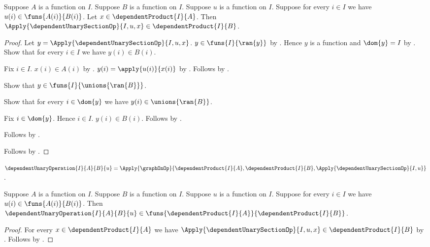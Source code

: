 \begin{proposition}\label{dependent_unary_section_type}
    Suppose $A$ is a function on $I$.
    Suppose $B$ is a function on $I$.
    Suppose $u$ is a function on $I$.
    Suppose for every $i\in I$ we have $u(i)\in\funs{A(i)}{B(i)}$.
    Let $x\in\dependentProduct{I}{A}$.
    Then
        $\Apply{\dependentUnarySectionOp}{I,u,x}
            \in\dependentProduct{I}{B}$.
\end{proposition}
\begin{proof}
    Let $y=\Apply{\dependentUnarySectionOp}{I,u,x}$.
    $y\in\funs{I}{\ran{y}}$ by
        .
    Hence $y$ is a function and $\dom{y}=I$ by
        .
    Show that for every $i\in I$ we have $y(i)\in B(i)$.
    \begin{subproof}
        Fix $i\in I$.
        $x(i)\in A(i)$ by .
        $y(i)=\apply{u(i)}{x(i)}$ by
            .
        Follows by .
    \end{subproof}
    Show that $y\in\funs{I}{\unions{\ran{B}}}$.
    \begin{subproof}
        Show that for every $i\in\dom{y}$ we have
            $y(i)\in\unions{\ran{B}}$.
        \begin{subproof}
            Fix $i\in\dom{y}$.
            Hence $i\in I$.
            $y(i)\in B(i)$.
            Follows by .
        \end{subproof}
        Follows by .
    \end{subproof}
    Follows by .
\end{proof}

\begin{definition}\label{dependent_unary_operation}
    $\dependentUnaryOperation{I}{A}{B}{u}
        =\Apply{\graphOnOp}{
            \dependentProduct{I}{A},\dependentProduct{I}{B},
            \Apply{\dependentUnarySectionOp}{I,u}}$.
\end{definition}

\begin{proposition}\label{dependent_unary_operation_type}
    Suppose $A$ is a function on $I$.
    Suppose $B$ is a function on $I$.
    Suppose $u$ is a function on $I$.
    Suppose for every $i\in I$ we have $u(i)\in\funs{A(i)}{B(i)}$.
    Then
        $\dependentUnaryOperation{I}{A}{B}{u}
            \in\funs{\dependentProduct{I}{A}}{
                \dependentProduct{I}{B}}$.
\end{proposition}
\begin{proof}
    For every $x\in\dependentProduct{I}{A}$ we have
        $\Apply{\dependentUnarySectionOp}{I,u,x}
            \in\dependentProduct{I}{B}$ by
        .
    Follows by
        .
\end{proof}

